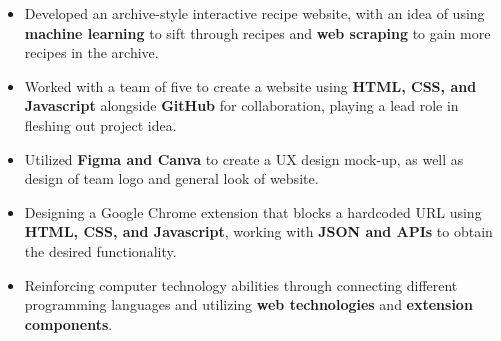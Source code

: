 \documentclass[10pt,a4paper,normalphoto]{altacv}
\begin{document}



\makecvheader





\begin{paracol}{2}


\begin{itemize}
\item Developed an archive-style interactive recipe website, with an idea of using \textbf{machine learning} to sift through recipes and \textbf{web scraping} to gain more recipes in the archive.
\item Worked with a team of five to create a website using \textbf{HTML, CSS, and Javascript} alongside \textbf{GitHub} for collaboration, playing a lead role in fleshing out project idea.
\item Utilized \textbf{Figma and Canva} to create a UX design mock-up, as well as design of team logo and general look of website.
\end{itemize}

\divider

\begin{itemize}
\item Designing a Google Chrome extension that blocks a hardcoded URL using \textbf{HTML, CSS, and Javascript}, working with \textbf{JSON and APIs} to obtain the desired functionality.
\item Reinforcing computer technology abilities through connecting different programming languages and
utilizing \textbf{web technologies} and \textbf{extension components}.
\end{itemize}

\divider



\end{paracol}
\end{document}
